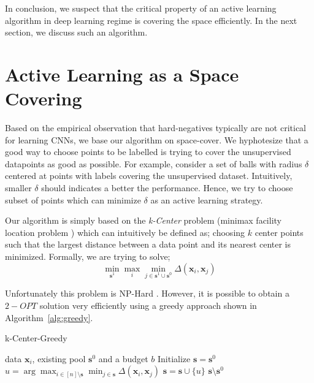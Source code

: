 \documentclass{article}
\begin{document}
In conclusion, we suspect that the critical property of an active learning algorithm in deep learning regime is covering the space efficiently. In the next section, we discuss such an algorithm.

\section{Active Learning as a Space Covering}
Based on the empirical observation that hard-negatives typically are not critical for learning CNNs, we base our algorithm on space-cover. We hyphotesize that a good way to choose points to be labelled is trying to cover the unsupervised datapoints as good as possible. For example, consider a set of balls with radius $\delta$ centered at points with labels covering the unsupervised dataset. Intuitively, smaller $\delta$ should indicates a better the performance. Hence, we try to choose subset of points which can minimize $\delta$ as an active learning strategy. 

Our algorithm is simply based on the \emph{k-Center} problem (minimax facility location problem \cite{facility}) which can intuitively be defined as; choosing $k$ center points such that the largest distance between a data point and its nearest center is minimized. Formally, we are trying to solve;
\begin{equation}
\min_{\mathbf{s}^1} \max_i \min_{j \in \mathbf{s}^1 \cup \mathbf{s}^0} \Delta(\mathbf{x}_i,\mathbf{x}_j)
\end{equation}

Unfortunately this problem is NP-Hard \cite{cook}. However, it is possible to obtain a $2-OPT$ solution very efficiently using a greedy approach shown in  Algorithm~\ref{alg:greedy}.

\begin{algorithm}[ht]
   \caption{k-Center-Greedy}
   \label{alg:greedy}
\begin{algorithmic}
    data $\mathbf{x}_i$, existing pool $\mathbf{s}^0$ and a budget $b$
    \STATE Initialize $\mathbf{s}=\mathbf{s}^0$
   \REPEAT
   \STATE $u=\arg\max_{i \in [n] \setminus \mathbf{s}} \min_{j \in \mathbf{s}} \Delta(\mathbf{x}_i, \mathbf{x}_j)$
   \STATE $\mathbf{s} = \mathbf{s} \cup \{u\}$
    $\mathbf{s} \setminus \mathbf{s}^0$
\end{algorithmic}
\end{algorithm}
\end{document}
